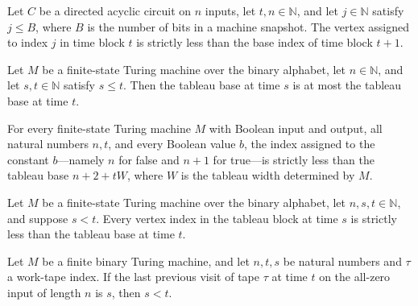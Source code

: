 \begin{theorem}
\label{Complexity.tableauVertex_lt}
\leanok
{}
Let $C$ be a directed acyclic circuit on $n$ inputs, let $t,n\in\mathbb{N}$, and let
$j\in\mathbb{N}$ satisfy $j\le B$, where $B$ is the number of bits in a machine
snapshot. The vertex assigned to index $j$ in time block $t$ is strictly less than the
base index of time block $t+1$.
\end{theorem}

\begin{theorem}
\label{Complexity.tableauBase_mono}
\leanok
{}
Let $M$ be a finite-state Turing machine over the binary alphabet, let $n\in\mathbb{N}$,
and let $s,t\in\mathbb{N}$ satisfy $s\le t$. Then the tableau base at time $s$ is at
most the tableau base at time $t$.
\end{theorem}

\begin{theorem}
\label{Complexity.tableauConst_lt}
\leanok
{}
For every finite-state Turing machine $M$ with Boolean input and output, all natural
numbers $n,t$, and every Boolean value $b$, the index assigned to the constant
$b$—namely $n$ for false and $n+1$ for true—is strictly less than the tableau base
$n+2+tW$, where $W$ is the tableau width determined by $M$.
\end{theorem}

\begin{theorem}
\label{Complexity.tableauBlock_lt}
\leanok
{}
Let $M$ be a finite-state Turing machine over the binary alphabet, let
$n,s,t\in\mathbb{N}$, and suppose $s<t$. Every vertex index in the tableau block at time
$s$ is strictly less than the tableau base at time $t$.
\end{theorem}

\begin{theorem}
\label{Complexity.prevVisit_lt}
\leanok
{}
Let $M$ be a finite binary Turing machine, and let $n,t,s$ be natural numbers and $\tau$
a work-tape index. If the last previous visit of tape $\tau$ at time $t$ on the all-zero
input of length $n$ is $s$, then $s<t$.
\end{theorem}

